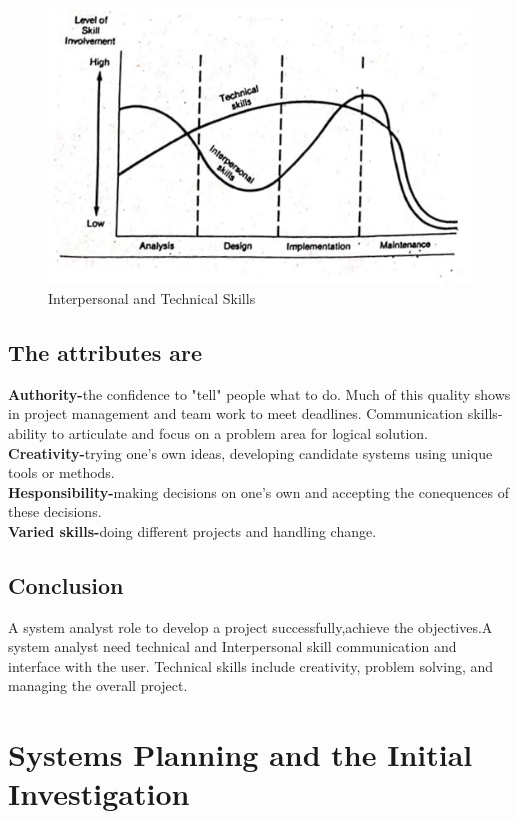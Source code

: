 \documentclass[a4paper,12pt]{report}
\begin{document}
\begin{figure}[h]
	\centering
	\includegraphics[width=0.9\linewidth]{3_1}
	\caption{Interpersonal and Technical Skills}
	\label{fig:31}
\end{figure}

\section{The attributes are}
\textbf{Authority-}the confidence to "tell" people what to do. Much of this quality shows in project management and team work to meet deadlines. Communication skills-ability to articulate and focus on a problem area for logical solution.\\
\textbf{Creativity-}trying one's own ideas, developing candidate systems using unique tools or methods.\\
\textbf{Hesponsibility-}making decisions on one's own and accepting the conequences of these decisions.\\
\textbf{Varied skills-}doing different projects and handling change.
\section{Conclusion}
A system analyst role to develop a project successfully,achieve the objectives.A system analyst need  technical and Interpersonal skill communication and interface with the user. Technical skills include creativity, problem solving, and managing the overall project.







\chapter{Systems Planning and the Initial Investigation}
\end{document}
